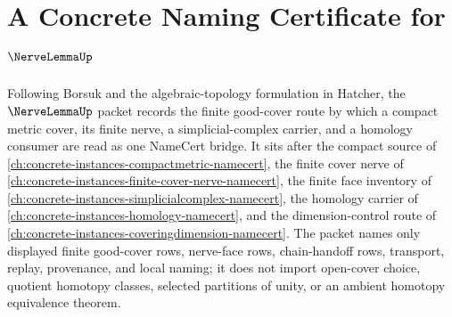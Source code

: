 \chapter{A Concrete Naming Certificate for $\NerveLemmaUp$}
\label{ch:concrete-instances-nerve-lemma-namecert}

Following Borsuk and the algebraic-topology formulation in Hatcher, the $\NerveLemmaUp$ packet records the finite good-cover route by which a compact metric cover, its finite nerve, a simplicial-complex carrier, and a homology consumer are read as one NameCert bridge. It sits after the compact source of \autoref{ch:concrete-instances-compactmetric-namecert}, the finite cover nerve of \autoref{ch:concrete-instances-finite-cover-nerve-namecert}, the finite face inventory of \autoref{ch:concrete-instances-simplicialcomplex-namecert}, the homology carrier of \autoref{ch:concrete-instances-homology-namecert}, and the dimension-control route of \autoref{ch:concrete-instances-coveringdimension-namecert}. The packet names only displayed finite good-cover rows, nerve-face rows, chain-handoff rows, transport, replay, provenance, and local naming; it does not import open-cover choice, quotient homotopy classes, selected partitions of unity, or an ambient homotopy equivalence theorem.

